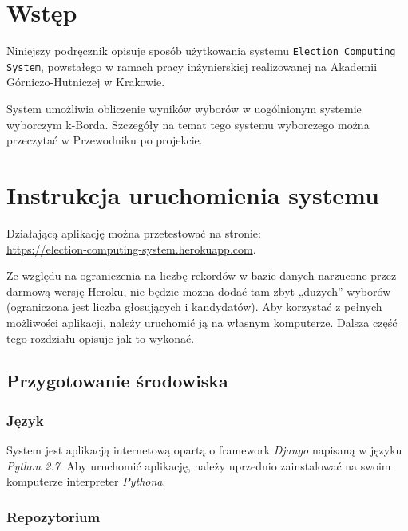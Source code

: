 \documentclass[pdflatex,11pt]{../aghdoc_version2}
\author{Tomasz Kasprzyk, Daniel Ogiela, Jakub Stępak}
\date{2016}
\begin{document}
\titlepages

\tableofcontents

\chapter{Wstęp}
\label{cha:wstep}

Niniejszy podręcznik opisuje sposób użytkowania systemu \texttt{Election Computing System}, powstałego w ramach pracy inżynierskiej realizowanej na Akademii Górniczo-Hutniczej w Krakowie.

System umożliwia obliczenie wyników wyborów w uogólnionym systemie wyborczym k-Borda. Szczegóły na temat tego systemu wyborczego można przeczytać w Przewodniku po projekcie.


\chapter{Instrukcja uruchomienia systemu}
\label{cha:uruchomienie}

Działającą aplikację można przetestować na stronie: \\ \url{https://election-computing-system.herokuapp.com}. 

Ze względu na ograniczenia na liczbę rekordów w bazie danych narzucone przez darmową wersję Heroku, nie będzie można dodać tam zbyt „dużych” wyborów (ograniczona jest liczba głosujących i kandydatów). Aby korzystać z pełnych możliwości aplikacji, należy uruchomić ją na własnym komputerze. Dalsza część tego rozdziału opisuje jak to wykonać.

\section{Przygotowanie środowiska}
\label{sec:srodowisko}

\subsection{Język}
\label{subsec:jezyk}

System jest aplikacją internetową opartą o framework \textit{Django }napisaną w języku \textit{Python 2.7}.
Aby uruchomić aplikację, należy uprzednio zainstalować na swoim komputerze interpreter \textit{Pythona}.

\subsection{Repozytorium}
\label{subsec:repo}
\end{document}
